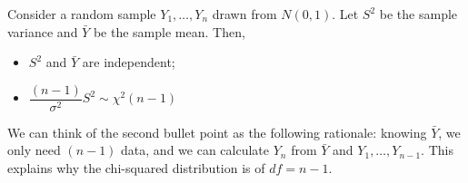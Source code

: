 \begin{thm}{}
	Consider a random sample $Y_1,\dots,Y_n$ drawn from $N(0,1)$. Let $S^2$	be the sample variance and $\bar Y$ be the sample mean. Then, 
	\begin{itemize}
		\item $S^2$ and $\bar Y$ are independent;
		\item $\dfrac{(n-1)}{\sigma^2}S^2\sim\chi^2(n-1)$
	\end{itemize}
\end{thm}
\begin{rmk}
	We can think of the second bullet point as the following rationale: knowing $\bar Y$, we only need $(n-1)$ data, and we can calculate $Y_n$ from $\bar Y$ and $Y_1,\dots,Y_{n-1}$. This explains why the chi-squared distribution is of $df=n-1$.	
\end{rmk}

